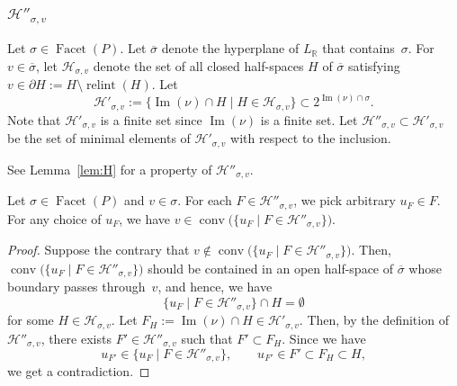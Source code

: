 \subsubsection{$\mathcal{H}''_{\sigma, v}$}\label{subsubsection:H}
\begin{defn}
Let $\sigma \in \operatorname{Facet}(P)$. 
Let $\overline{\sigma}$ denote the hyperplane of $L_{\mathbb{R}}$ that contains~$\sigma$. 
For $v \in \overline{\sigma}$, let $\mathcal{H}_{\sigma, v}$ denote the set of all closed half-spaces $H$ of 
$\overline{\sigma}$ satisfying $v \in \partial H := H  \setminus \operatorname{relint}(H)$. 
Let 
\[
\mathcal{H}' _{\sigma, v} := \{ \operatorname{Im}(\nu) \cap H \mid H \in \mathcal{H}_{\sigma, v} \} 
\subset 2 ^{\operatorname{Im}(\nu) \cap \sigma}. 
\]
Note that $\mathcal{H}' _{\sigma, v}$ is a finite set since $\operatorname{Im}(\nu)$ is a finite set. 
Let $\mathcal{H}'' _{\sigma, v} \subset \mathcal{H}' _{\sigma, v}$ 
be the set of minimal elements of $\mathcal{H}' _{\sigma, v}$ with respect to the inclusion. 
\end{defn}

See Lemma~\ref{lem:H} for a property of $\mathcal{H}'' _{\sigma, v}$. 

\begin{lem}\label{lem:H}
Let $\sigma \in \operatorname{Facet}(P)$ and $v \in \sigma$. 
For each $F \in \mathcal{H}'' _{\sigma, v}$, we pick arbitrary $u_F \in F$. 
For any choice of $u_F$, we have $v \in \operatorname{conv}\bigl ( \{ u_F \mid F \in \mathcal{H}'' _{\sigma, v} \} \bigr)$. 
\end{lem}
\begin{proof}
Suppose the contrary that $v \not \in \operatorname{conv}\bigl ( \{ u_F \mid F \in \mathcal{H}'' _{\sigma, v} \} \bigr)$. 
Then, $\operatorname{conv}\bigl ( \{ u_F \mid F \in \mathcal{H}'' _{\sigma, v} \} \bigr)$ 
should be contained in an open half-space of $\overline{\sigma}$ whose boundary passes through~$v$, 
and hence, we have
\[
\{ u_F \mid F \in \mathcal{H}'' _{\sigma, v} \} \cap H = \emptyset
\]
for some $H \in \mathcal{H}_{\sigma, v}$. 
Let $F_H := \operatorname{Im}(\nu) \cap H \in \mathcal{H}' _{\sigma, v}$. 
Then, by the definition of $\mathcal{H}'' _{\sigma, v}$, there exists $F' \in \mathcal{H}'' _{\sigma, v}$ such that $F' \subset F_H$.
Since we have 
\[
u_{F'} \in \{ u_F \mid F \in \mathcal{H}'' _{\sigma, v} \}, \qquad 
u_{F'} \in F' \subset F_H \subset H, 
\]
we get a contradiction. 
\end{proof}

